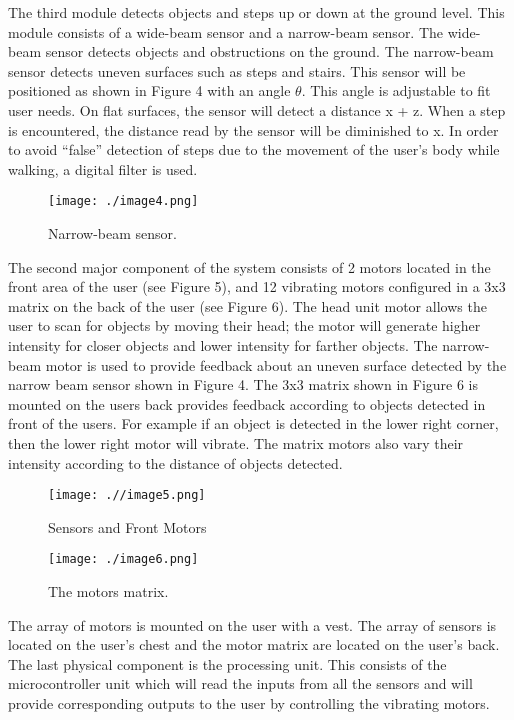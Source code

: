The third module detects objects and steps up or down at the ground
level. This module consists of a wide-beam sensor and a narrow-beam
sensor. The wide-beam sensor detects objects and obstructions on the
ground. The narrow-beam sensor detects uneven surfaces such as steps and
stairs. This sensor will be positioned as shown in Figure 4 with an
angle $\theta$. This angle is adjustable to fit user needs. On flat surfaces,
the sensor will detect a distance x + z. When a step is encountered, the
distance read by the sensor will be diminished to x. In order to avoid
``false'' detection of steps due to the movement of the user's body
while walking, a digital filter is used.

\begin{figure}[h]
\texttt{[image: ./image4.png]}
\caption{Narrow-beam sensor.}
\label{figure:caseStudyNarrowBeam}
\end{figure}


The second major component of the system consists of 2 motors located in
the front area of the user (see Figure 5), and 12 vibrating motors
configured in a 3x3 matrix on the back of the user (see Figure 6). The
head unit motor allows the user to scan for objects by moving their
head; the motor will generate higher intensity for closer objects and
lower intensity for farther objects. The narrow-beam motor is used to
provide feedback about an uneven surface detected by the narrow beam
sensor shown in Figure 4. The 3x3 matrix shown in Figure 6 is mounted on
the users back provides feedback according to objects detected in front
of the users. For example if an object is detected in the lower right
corner, then the lower right motor will vibrate. The matrix motors also
vary their intensity according to the distance of objects detected.

\begin{figure}[h]
\texttt{[image: .//image5.png]}
\caption{Sensors and Front Motors}
\label{figure:caseStudySensorMotors}
\end{figure}


\begin{figure}[h]
\texttt{[image: ./image6.png]}
\caption{The motors matrix.}
\label{figure:caseStudyMotorMatrix}
\end{figure}

The array of motors is mounted on the user with a vest. The array of
sensors is located on the user's chest and the motor matrix are located
on the user's back. The last physical component is the processing unit.
This consists of the microcontroller unit which will read the inputs
from all the sensors and will provide corresponding outputs to the user
by controlling the vibrating motors.


